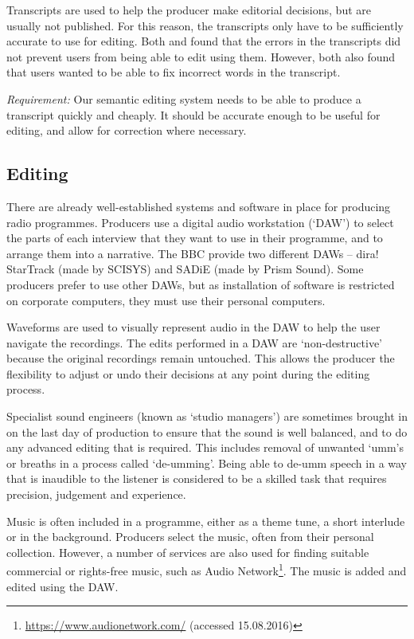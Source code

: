 Transcripts are used to help the producer make editorial decisions, but are
usually not published. For this reason, the transcripts only have to be
sufficiently accurate to use for editing. Both \citet{Whittaker2004} and
\citet{Sivaraman2016} found that the errors in the transcripts did not prevent users
from being able to edit using them. However, both also found that
users wanted to be able to fix incorrect words in the transcript.

\textit{Requirement:} Our semantic editing system needs to be able to produce a transcript quickly
and cheaply. It should be accurate enough to be useful for editing, and allow
for correction where necessary.

\subsection{Editing}
There are already well-established systems and software in place for producing
radio programmes. Producers use a digital audio workstation (`DAW') to select
the parts of each interview that they want to use in their programme, and to
arrange them into a narrative. The BBC provide two different DAWs -- dira!
StarTrack (made by SCISYS) and SADiE (made by Prism Sound). Some producers
prefer to use other DAWs, but as installation of software is restricted on
corporate computers, they must use their personal computers.

Waveforms are used to visually represent audio in the DAW to help the user
navigate the recordings. The edits performed in a DAW are `non-destructive'
because the original recordings remain untouched. This allows the producer the
flexibility to adjust or undo their decisions at any point during the editing
process.

Specialist sound engineers (known as `studio managers') are sometimes brought
in on the last day of production to ensure that the sound is well balanced, and
to do any advanced editing that is required. This includes removal of
unwanted `umm's or breaths in a process called `de-umming'. Being able to
de-umm speech in a way that is inaudible to the listener is considered to be a skilled task that
requires precision, judgement and experience.

Music is often included in a programme, either as a theme tune, a short
interlude or in the background. Producers select the music, often from their
personal collection. However, a number of services are also used for finding
suitable commercial or rights-free music, such as Audio
Network\footnote{\url{https://www.audionetwork.com/} (accessed 15.08.2016)}.
The music is added and edited using the DAW.

